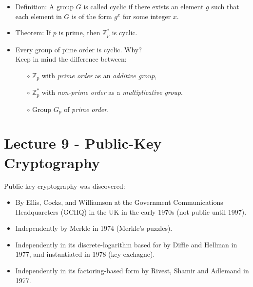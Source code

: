 \documentclass[a4paper]{scrartcl}
\begin{document}
\begin{itemize}
\item Definition: A group $G$ is called cyclic if there exists an element $g$ such that each element in $G$ is of the form $g^x$ for some integer $x$.
\item Theorem: If $p$ is prime, then $\mathbb{Z}_p^*$ is cyclic.
\item Every group of pime order is cyclic. Why?\\Keep in mind the difference between:
\begin{itemize}
\item [$\circ$] $\mathbb{Z}_p$ with \textit{prime order} as an \textit{additive group},
\item [$\circ$] $\mathbb{Z}_p^*$ with \textit{non-prime order} as a \textit{multiplicative group}.
\item [$\circ$] Group $G_p$ of \textit{prime order}.
\end{itemize}
\end{itemize}

\section*{Lecture 9 - Public-Key Cryptography}

Public-key cryptography was discovered:

\begin{itemize}
\item By Ellis, Cocks, and Williamson at the Government Communications Headquareters (GCHQ) in the UK in the early 1970s (not public until 1997).
\item Independently by Merkle in 1974 (Merkle's puzzles).
\item Independently in its discrete-logarithm based for by Diffie and Hellman in 1977, and instantiated in 1978 (key-exchagne).
\item Independently in its factoring-based form by Rivest, Shamir and Adlemand in 1977.
\end{itemize}
\end{document}
